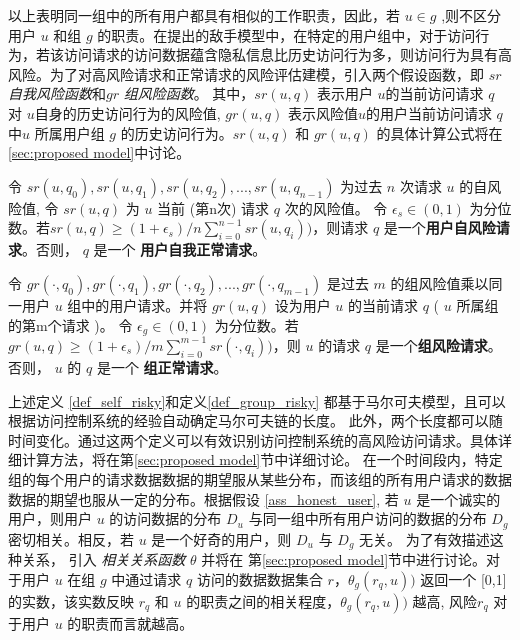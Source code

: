 以上表明同一组中的所有用户都具有相似的工作职责，因此，若 $u \in g$ ,则不区分用户 $u$ 和组 $g$ 的职责。在提出的敌手模型中，在特定的用户组中，对于访问行为，若该访问请求的访问数据蕴含隐私信息比历史访问行为多，则访问行为具有高风险。为了对高风险请求和正常请求的风险评估建模，引入两个假设函数，即 $sr$ \emph{自我风险函数}和$gr$ \emph{组风险函数}。 其中，$sr(u,q)$ 表示用户 $u$的当前访问请求 $q$ 对 $u$自身的历史访问行为的风险值,  $gr(u,q)$ 表示风险值$u$的用户当前访问请求 $q$中$u$ 所属用户组 $g$ 的历史访问行为。$sr(u,q)$ 和 $gr(u,q)$ 的具体计算公式将在 \ref{sec:proposed model}中讨论。

\begin{definition}%
	\label{def_self_risky}
	令 $sr(u, q_0), sr(u, q_1), sr(u, q_2), ... ,sr(u, q_{n-1})$ 为过去 $n$ 次请求 $u$ 的自风险值, 令 $sr(u,q)$ 为 $u$ 当前 (第n次) 请求 $q$ 次的风险值。 令 $\epsilon_s \in (0,1)$ 为分位数。若$sr(u,q) \geq  (1+\epsilon_s) / n  \sum ^{n-1}_{i=0}{sr(u,q_i))}$，则请求 $q$ 是一个\textbf{用户自风险请求}。否则， $q$ 是一个 \textbf{用户自我正常请求}。
\end{definition}

\begin{definition}%
	\label{def_group_risky}
	令 $gr(\cdot, q_0), gr(\cdot, q_1), gr(\cdot, q_2), ... , gr(\cdot, q_{m-1})$ 是过去 $m$ 的组风险值乘以同一用户 $u$ 组中的用户请求。并将 $gr(u,q)$ 设为用户 $u$ 的当前请求 $q$  ( $u$ 所属组的第m个请求 )。 令 $\epsilon_g \in (0,1)$ 为分位数。若$gr(u,q) \geq  (1+\epsilon_s) / m  \sum ^{m-1}_{i=0}{sr(\cdot,q_i))}$，则 $u$ 的请求 $q$ 是一个\textbf{组风险请求}。否则， $u$ 的 $q$ 是一个 \textbf{组正常请求}。
\end{definition}


上述定义 \ref{def_self_risky}和定义\ref{def_group_risky} 都基于马尔可夫模型，且可以根据访问控制系统的经验自动确定马尔可夫链的长度。 此外，两个长度都可以随时间变化。通过这两个定义可以有效识别访问控制系统的高风险访问请求。具体详细计算方法，将在第\ref{sec:proposed model}节中详细讨论。 在一个时间段内，特定组的每个用户的请求数据数据的期望服从某些分布，而该组的所有用户请求的数据数据的期望也服从一定的分布。根据假设 \ref{ass_honest_user}, 若 $u$ 是一个诚实的用户，则用户 $u$ 的访问数据的分布 $D_u$ 与同一组中所有用户访问的数据的分布 $D_g$ 密切相关。相反，若 $u$ 是一个好奇的用户，则 $D_u$ 与 $D_g$ 无关。 为了有效描述这种关系， 引入 \emph{相关关系函数} $\theta$ 并将在 第\ref{sec:proposed model}节中进行讨论。对于用户 $u$ 在组 $g$ 中通过请求 $q$ 访问的数据数据集合 $r$，$\theta_g (r_q,u))$ 返回一个 [0,1]的实数，该实数反映 $r_q$ 和 $u$ 的职责之间的相关程度，$\theta_g (r_q,u))$ 越高, 风险$r_q$ 对于用户 $u$ 的职责而言就越高。


